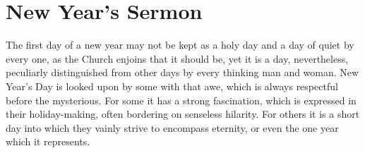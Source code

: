 \chapter{New Year's Sermon}


The first day of a new year may not be kept 
as a holy day and a day of quiet by every 
one, as the Church enjoins that it should be, yet 
it is a day, nevertheless, peculiarly distinguished 
from other days by every thinking man and 
woman. New Year's Day is looked upon by 
some with that awe, which is always respectful 
before the mysterious. For some it has a 
strong fascination, which is expressed in their 
holiday-making, often bordering on senseless 
hilarity. For others it is a short day into 
which they vainly strive to encompass eternity, 
or even the one year which it represents. 

